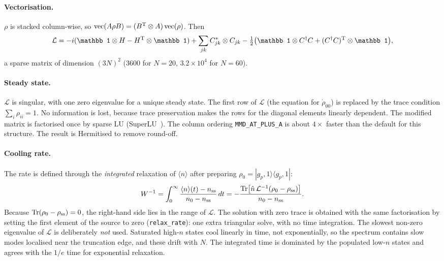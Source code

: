 \documentclass[11pt,a4paper]{article}
\newcommand{\ket}[1]{|#1\rangle}
\newcommand{\bra}[1]{\langle #1|}
\newcommand{\code}[1]{\texttt{#1}}
\begin{document}
\paragraph{Vectorisation.} $\rho$ is stacked column-wise, so ${\rm vec}(A\rho B)=(B^{\rm T}\otimes A)\,{\rm vec}(\rho)$. Then
\begin{equation}
  \mathcal L=-i(\mathbb1\otimes H-H^{\rm T}\otimes\mathbb1)+\sum_{jk}C_{jk}^*\otimes C_{jk}-\tfrac12\big(\mathbb1\otimes C^\dagger C+(C^\dagger C)^{\rm T}\otimes\mathbb1\big),
\end{equation}
a sparse matrix of dimension $(3N)^2$ (3600 for $N=20$, $3.2\times10^4$ for $N=60$).

\paragraph{Steady state.} $\mathcal L$ is singular, with one zero eigenvalue for a unique steady state. The first row of $\mathcal L$ (the equation for $\dot\rho_{00}$) is replaced by the trace condition $\sum_i\rho_{ii}=1$. No information is lost, because trace preservation makes the rows for the diagonal elements linearly dependent. The modified matrix is factorised once by sparse LU (SuperLU~\cite{li2005}). The column ordering \code{MMD\_AT\_PLUS\_A} is about $4\times$ faster than the default for this structure. The result is Hermitised to remove round-off.

\paragraph{Cooling rate.} The rate is defined through the \emph{integrated} relaxation of $\langle n\rangle$ after preparing $\rho_0=\ket{g_p,1}\bra{g_p,1}$:
\begin{equation}
  W^{-1}=\int_0^\infty\frac{\langle n\rangle(t)-n_{\rm ss}}{n_0-n_{\rm ss}}\,dt
        =-\frac{{\rm Tr}\big[\hat n\,\mathcal L^{-1}(\rho_0-\rho_{\rm ss})\big]}{n_0-n_{\rm ss}} .
\end{equation}
Because ${\rm Tr}(\rho_0-\rho_{\rm ss})=0$, the right-hand side lies in the range of $\mathcal L$. The solution with zero trace is obtained with the same factorisation by setting the first element of the source to zero (\code{relax\_rate}): one extra triangular solve, with no time integration. The slowest non-zero eigenvalue of $\mathcal L$ is deliberately \emph{not} used. Saturated high-$n$ states cool linearly in time, not exponentially, so the spectrum contains slow modes localised near the truncation edge, and these drift with $N$. The integrated time is dominated by the populated low-$n$ states and agrees with the $1/e$ time for exponential relaxation.
\end{document}
